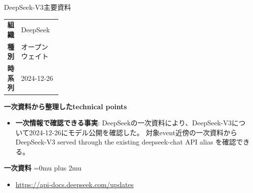 \begin{technicalnote}{DeepSeek-V3}{主要資料}
\begingroup
\begin{tabularx}{\linewidth}{@{}>{\bfseries}p{0.22\linewidth}X@{}}
組織 & DeepSeek \\
種別 & オープンウェイト \\
時系列 & 2024-12-26 \\
\end{tabularx}
\smallskip
{\bfseries 一次資料から整理したtechnical points}
\begin{itemize}[leftmargin=1.5em,itemsep=0.35em]
\item \textbf{一次情報で確認できる事実}: DeepSeekの一次資料により、DeepSeek-V3について2024-12-26にモデル公開を確認した。 対象event近傍の一次資料から DeepSeek-V3 served through the existing deepseek-chat API alias を確認できる。
\end{itemize}
\begin{minipage}{\linewidth}
\begin{samepage}
{\bfseries 一次資料}
\begingroup\sloppy
\Urlmuskip=0mu plus 2mu\relax
\begin{itemize}[leftmargin=1.5em,itemsep=0.25em]
\item {\scriptsize\url{https://api-docs.deepseek.com/updates}}
\end{itemize}
\endgroup
\end{samepage}
\end{minipage}
\endgroup
\end{technicalnote}
\medskip

